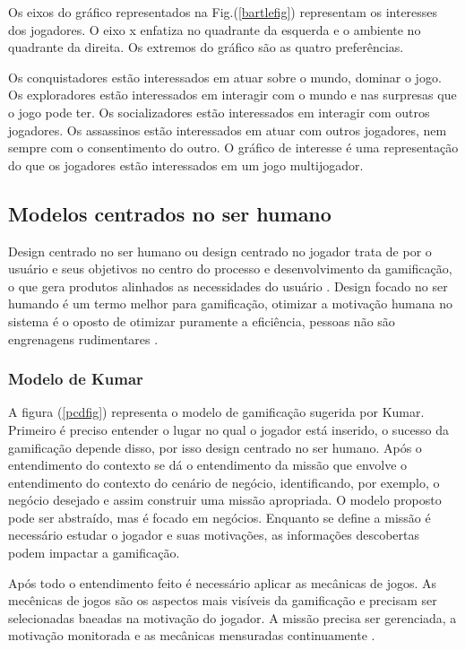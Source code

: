  Os eixos do gráfico representados na Fig.(\ref{bartlefig}) representam os interesses dos jogadores. O eixo x enfatiza no quadrante da esquerda e o ambiente no quadrante da direita. Os extremos do gráfico são as quatro preferências. 

 Os conquistadores estão interessados em atuar sobre o mundo, dominar o jogo. Os exploradores estão interessados em interagir com o mundo e nas surpresas que o jogo pode ter. Os socializadores estão interessados em interagir com outros jogadores. Os assassinos estão interessados em atuar com outros jogadores, nem sempre com o consentimento do outro. O gráfico de interesse é uma representação do que os jogadores estão interessados em um jogo multijogador.
 

\subsection{Modelos centrados no ser humano}

Design centrado no ser humano ou design centrado no jogador trata de por o usuário e seus objetivos no centro do processo e desenvolvimento da gamificação, o que gera produtos alinhados as necessidades do usuário \cite{kumar2013gamification}. Design focado no ser humando é um termo melhor para gamificação, otimizar a motivação humana no sistema é o oposto de otimizar puramente a eficiência, pessoas não são engrenagens rudimentares \cite{chou2015actionable}.

\subsubsection{Modelo de Kumar}

A figura (\ref{pcdfig}) representa o modelo de gamificação sugerida por Kumar. Primeiro é preciso entender o lugar no qual o jogador está inserido, o sucesso da gamificação depende disso, por isso design centrado no ser humano. Após o entendimento do contexto se dá o entendimento da missão que envolve o entendimento do contexto do cenário de negócio, identificando, por exemplo, o negócio desejado e assim construir uma missão apropriada. O modelo proposto pode ser abstraído, mas é focado em negócios. Enquanto se define a missão é necessário estudar o jogador e suas motivações, as informações descobertas podem impactar a gamificação.

 Após todo o entendimento feito é necessário aplicar as mecânicas de jogos. As mecênicas de jogos são os aspectos mais visíveis da gamificação e precisam ser selecionadas baeadas na motivação do jogador. A missão precisa ser gerenciada, a motivação monitorada e as mecânicas mensuradas continuamente \cite{kumar2013gamification}.

